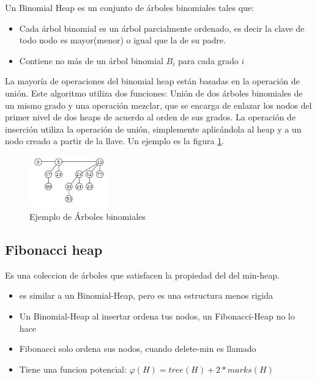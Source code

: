 \documentclass[a4paper,twocolumn,10pt]{article}
\begin{document}
Un Binomial Heap es un conjunto de árboles binomiales tales que:
\begin{itemize}
  \item Cada árbol binomial es un árbol parcialmente ordenado, es decir la clave de todo nodo es mayor(menor) o igual que la de su padre. 
  \item Contiene no más de un árbol binomial $B_i$ para cada grado $i$
\end{itemize}
La mayoría de operaciones del binomial heap están basadas en la operación de unión. Este algoritmo 
utiliza dos funciones: Unión de dos árboles binomiales de un mismo grado y una operación mezclar, 
que se encarga de enlazar los nodos del primer nivel de dos heaps de acuerdo al orden de sus grados.
\newline
La operación de inserción utiliza la operación de unión, simplemente aplicándola al heap y a un nodo creado a 
partir de la llave. Un ejemplo es la figura \ref{Figure:binomial_heap}.

\begin{figure}
 \caption{Ejemplo de Árboles binomiales}\label{Figure:binomial_heap}
 \centering
    \includegraphics[width=0.3\textwidth]{binomial_heap.jpg}
\end{figure}

\subsection{Fibonacci heap}

 Es una coleccion de árboles que satisfacen la propiedad del del min-heap. \cite{princeton_slides_rezaul_dijkstraFibonacci}

\begin{itemize}
\item es similar a un Binomial-Heap, pero es una estructura menos rigida
\item Un Binomial-Heap al insertar ordena tus nodos, un Fibonacci-Heap no lo hace
\item Fibonacci solo ordena sus nodos, cuando delete-min es llamado
\item Tiene una funcion potencial: $\varphi(H) = tree(H)+2*marks(H)$
\end{itemize}
\end{document}
